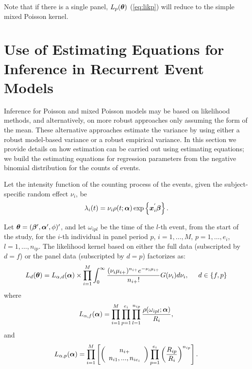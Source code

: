 \documentclass[12pt]{article}
\def \alph{\mbox{\boldmath $\alpha$ \unboldmath}\!\!}
\def \bet{\mbox{\boldmath $\beta$ \unboldmath}\!\!}
\def \thet{\mbox{\boldmath $\theta$ \unboldmath}\!\!}
\def \bx{\mbox{\boldmath $x$ \unboldmath}\!\!}
\begin{document}
\noindent Note that if there is a single
panel,  $L_p(\thet)$ (\ref{eq:likp}) will reduce to
the simple mixed Poisson kernel.


\section{Use of Estimating Equations for Inference in Recurrent Event Models}\label{sec2}

Inference for Poisson and mixed Poisson models may be based on likelihood methods, and alternatively, on more robust approaches only assuming the form of the mean. These alternative approaches estimate the variance by using either a robust model-based variance or a robust empirical variance. In this section we provide details on how estimation can be carried out using estimating equations; we build the estimating equations for regression parameters from the negative binomial distribution for the counts of events.  

Let the intensity function of the counting process of the events, given the subject-specific random effect $\nu_i$, be
\begin{equation}
\lambda_{i}(t)=\nu_i\rho(t;\alph)\exp\left\{ {\bx}_{i}^{'} \bet\right\}. 
\label{eq:inte}
\end{equation}


Let $\thet=(\bet',\alph',\phi)'$, and  let
$\omega_{ipl}$ be the time of the $l$-th event, from the start of the study, for the $i$-th
individual in panel period $p$, $i=1, \ldots,M$, $p=1, \ldots, e_i$,
$l=1,\ldots, n_{ip}$.  The likelihood kernel based on either the full data (subscripted by
$d=f$) or the panel data (subscripted by $d=p$) factorizes as:
\begin{equation}
L_{d}(\thet)= L_{\alpha,d}(\alph) \times \prod_{i=1}^{M}\int_{0}^{\infty} \frac{(\nu_{i}\mu_{i+})^{n_{i+}} e^{-\nu_{i}\mu_{i+}}}{n_{i+}!} G(\nu_{i}) d\nu_{i}, \hspace{.5cm} d \in \{ f,p\}
\label{eq:lik}
\end{equation}
where
\begin{equation}
L_{\alpha,f}(\alph)= \prod_{i=1}^{M}\prod_{p=1}^{e_i}\prod_{l=1}^{n_{ip}}
\frac{\rho(\omega_{ipl};\alph)}{R_i},
\label{eq:full-lik}
\end{equation} and
\begin{equation}
L_{\alpha, p}(\alph)=\prod^M_{i=1} \left [     \left ( \begin{array}{c}
         n_{i+} \\
        n_{i1},...,n_{ie_i}  \end{array} \right )
        \prod^{e_i}_{p=1}  \left( \frac{R_{ip}}{R_{i}}\right)^{n_{ip}}     
\right ].
\label{eq:panel-lik}
\end{equation}
\end{document}
